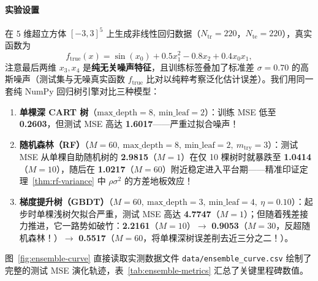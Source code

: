 \paragraph{实验设置}
在 5 维超立方体 $[-3, 3]^5$ 上生成非线性回归数据（$N_{\text{tr}} = 220$，$N_{\text{te}} = 220$），真实函数为
\[
  f_{\mathrm{true}}(x) = \sin(x_0) + 0.5 x_1^2 - 0.8 x_2 + 0.4 x_0 x_1,
\]
注意最后两维 $x_3, x_4$ 是\textbf{纯无关噪声特征}，且训练标签叠加了标准差 $\sigma = 0.70$ 的高斯噪声（测试集与无噪真实函数 $f_{\mathrm{true}}$ 比对以纯粹考察泛化估计误差）。我们用同一套纯 NumPy 回归树引擎对比三种模型：
\begin{enumerate}
  \item \textbf{单棵深 CART 树}（$\text{max\_depth}=8,\ \text{min\_leaf}=2$）：训练 MSE 低至 \textbf{0.2603}，但测试 MSE 高达 \textbf{1.6017}——严重过拟合噪声！
  \item \textbf{随机森林（RF）}（$M=60,\ \text{max\_depth}=8,\ \text{min\_leaf}=2,\ m_{\text{try}}=3$）：测试 MSE 从单棵自助随机树的 \textbf{2.9815}（$M=1$）在仅 10 棵树时就暴跌至 \textbf{1.0414}（$M=10$），随后在 \textbf{1.0217}（$M=60$）附近稳定进入平台期——精准印证定理~\ref{thm:rf-variance} 中 $\rho\sigma^2$ 的方差地板效应！
  \item \textbf{梯度提升树（GBDT）}（$M=60,\ \text{max\_depth}=3,\ \text{min\_leaf}=4,\ \eta=0.10$）：起步时单棵浅树欠拟合严重，测试 MSE 高达 \textbf{4.7747}（$M=1$）；但随着残差接力推进，它一路势如破竹：\textbf{2.2161}（$M=10$）$\to$ \textbf{0.9053}（$M=30$，反超随机森林！）$\to$ \textbf{0.5517}（$M=60$，将单棵深树误差削去近三分之二！）。
\end{enumerate}

图~\ref{fig:ensemble-curve} 直接读取实测数据文件 \texttt{data/\allowbreak ensemble\_curve.csv} 绘制了完整的测试 MSE 演化轨迹，表~\ref{tab:ensemble-metrics} 汇总了关键里程碑数值。

